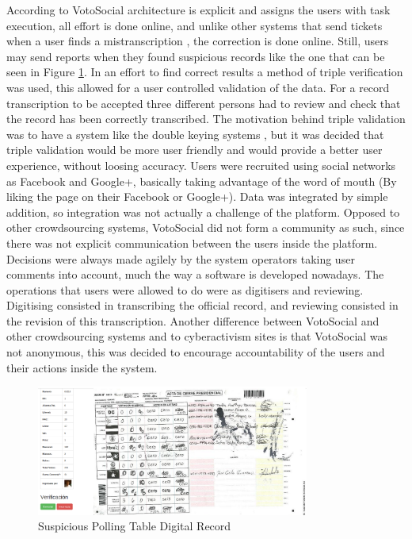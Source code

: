 \documentclass[letterpaper,10pt]{article}
\begin{document}
According to \cite{doan2011} VotoSocial architecture is explicit and assigns the users with task execution, all effort is done online, and unlike other systems that send tickets when a user finds a mistranscription \citep{haaf2013}, the correction is done online. Still, users may send reports when they found suspicious records like the one that can be seen in Figure \ref{fig:strange}. In an effort to find correct results a method of triple verification was used, this allowed for a user controlled validation of the data. For a record transcription to be accepted three different persons had to review and check that the record has been correctly transcribed. The motivation behind triple validation was to have a system like the double keying systems \citep{haaf2013}, but it was decided that triple validation would be more user friendly and would provide a better user experience, without loosing accuracy. Users were recruited using social networks as Facebook and Google+, basically taking advantage of the word of mouth (By liking the page on their Facebook or Google+). Data was integrated by simple addition, so integration was not actually a challenge of the platform. Opposed to other crowdsourcing systems, VotoSocial did not form a community as such, since there was not explicit communication between the users inside the platform. Decisions were always made agilely by the system operators taking user comments into account, much the way a software is developed nowadays. The operations that users were allowed to do were as digitisers and reviewing. Digitising consisted in transcribing the official record, and reviewing consisted in the revision of this transcription. Another difference between VotoSocial and other crowdsourcing systems and to cyberactivism sites is that VotoSocial was not anonymous, this was decided to encourage accountability of the users and their actions inside the system.

\begin{figure}[h!]
    \centering
    \includegraphics[width=0.8\textwidth]{images/vs-valid-strange}
    \caption{Suspicious Polling Table Digital Record}
    \label{fig:strange}
\end{figure}
\end{document}

